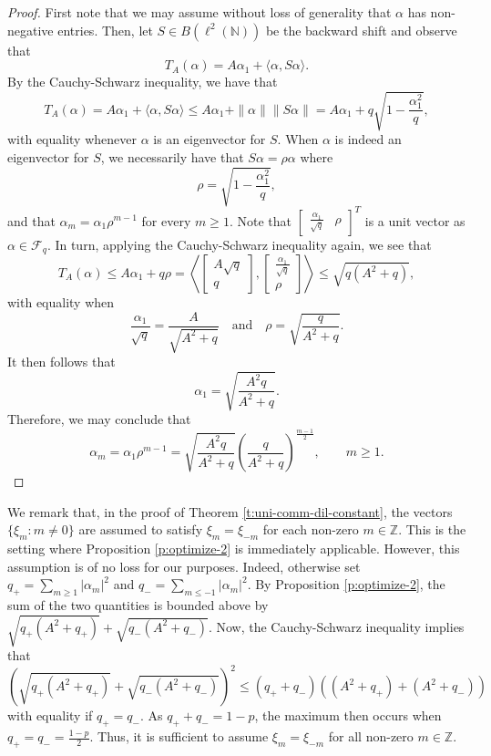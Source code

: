 \documentclass[10pt]{amsart}
\newcommand{\bN}{{\mathbb{N}}}
\newcommand{\bZ}{{\mathbb{Z}}}
\newcommand{\F}{{\mathcal{F}}}
\begin{document}
\begin{proof}
    First note that we may assume without loss of generality that $\alpha$ has non-negative entries. Then, let $S\in B(\ell^2(\bN))$ be the backward shift and observe that
    \[
        T_A(\alpha) = A\alpha_1 + \langle \alpha, S\alpha\rangle.
    \]
    By the Cauchy-Schwarz inequality, we have that
    \[
        T_A(\alpha) = A \alpha_1 + \langle \alpha, S\alpha\rangle \leq A \alpha_1 + \|\alpha\| \|S\alpha\| = A \alpha_1 + q\sqrt{1-\frac{\alpha_1^2}{q}},
    \]
    with equality whenever $\alpha$ is an eigenvector for $S$. When $\alpha$ is indeed an eigenvector for $S$, we necessarily have that $S\alpha = \rho\alpha$ where
    \[
        \rho = \sqrt{1-\frac{\alpha_1^2}{q}},
    \]
    and that $\alpha_m = \alpha_1 \rho^{m-1}$ for every $m\geq 1$. Note that $\begin{bmatrix}\frac{\alpha_1}{\sqrt{q}} & \rho\end{bmatrix}^T$ is a unit vector as $\alpha\in\F_q$. In turn, applying the Cauchy-Schwarz inequality again, we see that 
    \[
        T_A(\alpha)\leq A\alpha_1 + q\rho = \left\langle \begin{bmatrix}  A\sqrt{q}\\ q\end{bmatrix}, \begin{bmatrix}  \frac{\alpha_1}{\sqrt{q}}\\ \rho\end{bmatrix} \right\rangle \leq \sqrt{q(A^2+q)},
    \]
    with equality when
    \[
        \frac{\alpha_1}{\sqrt{q}} = \frac{A}{\sqrt{A^2+q}} \quad \text{and} \quad \rho = \sqrt{\frac{q}{A^2+q}}.
    \]
    It then follows that
    \[
        \alpha_1 = \sqrt{\frac{A^2q}{A^2+q}}.
    \]
    Therefore, we may conclude that
    \[
        \alpha_m = \alpha_1 \rho^{m-1}  = \sqrt{\frac{A^2q}{A^2+q}}\left( \frac{q}{A^2+q}\right)^{\frac{m-1}{2}}, \qquad m\geq 1.
    \]
\end{proof}

We remark that, in the proof of Theorem \ref{t:uni-comm-dil-constant}, the vectors $\{\xi_m: m\neq 0\}$ are assumed to satisfy $\xi_m = \xi_{-m}$ for each non-zero $m\in\bZ$. This is the setting where Proposition \ref{p:optimize-2} is immediately applicable. However, this assumption is of no loss for our purposes. Indeed, otherwise set $q_+ = \sum_{m\geq 1}|\alpha_m|^2$ and $q_- = \sum_{m\leq -1} |\alpha_m|^2$. By Proposition \ref{p:optimize-2}, the sum of the two quantities is bounded above by $\sqrt{q_+(A^2+q_+)}+\sqrt{q_-(A^2+q_-)}$. Now, the Cauchy-Schwarz inequality implies that
\[
    \left(\sqrt{q_+(A^2+q_+)}+\sqrt{q_-(A^2+q_-)}\right)^2 \leq (q_+ + q_-)\left((A^2+q_+) + (A^2+q_-)\right)
\]
with equality if $q_+ = q_-$. As $q_+ + q_- = 1-p$, the maximum then occurs when $q_+ = q_- = \frac{1-p}{2}$. Thus, it is sufficient to assume $\xi_m = \xi_{-m}$ for all non-zero $m\in\bZ$.
\end{document}

